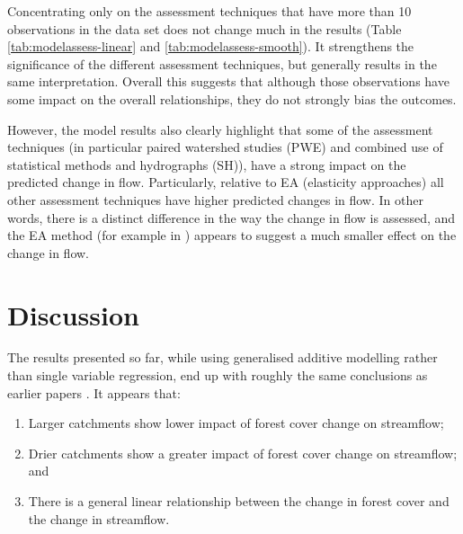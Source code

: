 \documentclass[]{elsarticle} %
\providecommand{\tightlist}{%
  \setlength{\itemsep}{0pt}\setlength{\parskip}{0pt}}
\begin{document}
Concentrating only on the assessment techniques that have more than 10 observations in the data set does not change much in the results (Table \ref{tab:modelassess-linear} and \ref{tab:modelassess-smooth}). It strengthens the significance of the different assessment techniques, but generally results in the same interpretation. Overall this suggests that although those observations have some impact on the overall relationships, they do not strongly bias the outcomes.

However, the model results also clearly highlight that some of the assessment techniques (in particular paired watershed studies (PWE) and combined use of statistical methods and hydrographs (SH)), have a strong impact on the predicted change in flow. Particularly, relative to EA (elasticity approaches) all other assessment techniques have higher predicted changes in flow. In other words, there is a distinct difference in the way the change in flow is assessed, and the EA method (for example in \citet{zhou2015}) appears to suggest a much smaller effect on the change in flow.

\hypertarget{discussion}{%
\section{Discussion}\label{discussion}}

The results presented so far, while using generalised additive modelling rather than single variable regression, end up with roughly the same conclusions as earlier papers \citep{zhang2017, filoso2017}. It appears that:

\begin{enumerate}
\def\labelenumi{\arabic{enumi}.}
\tightlist
\item
  Larger catchments show lower impact of forest cover change on streamflow;\\
\item
  Drier catchments show a greater impact of forest cover change on streamflow; and\\
\item
  There is a general linear relationship between the change in forest cover and the change in streamflow.
\end{enumerate}
\end{document}
